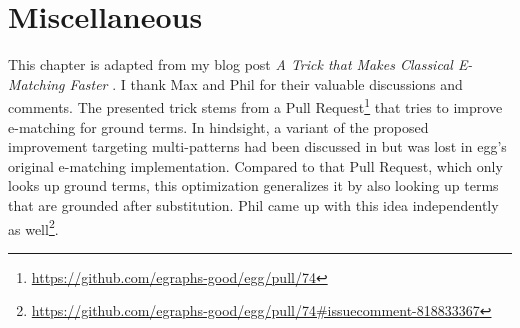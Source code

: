 \section{Miscellaneous}\label{miscellaneous}

This chapter is adapted 
 from my blog post 
 \textit{A Trick that Makes Classical E-Matching Faster} \citep{nonrelational-ematching-post}.
I thank Max and Phil for their valuable discussions and comments.
The presented trick stems from a Pull Request\footnote{\url{https://github.com/egraphs-good/egg/pull/74}}
 that tries to improve e-matching for ground terms.
In hindsight, 
 a variant of the proposed improvement targeting multi-patterns
 had been discussed in \citet{efficient-ematching}
 but was lost in egg's original e-matching implementation.
Compared to that Pull Request, which
 only looks up ground terms, this optimization generalizes it by also
 looking up terms that are grounded after substitution.
Phil came up with this idea independently 
 as well\footnote{\url{https://github.com/egraphs-good/egg/pull/74\#issuecomment-818833367}}.
